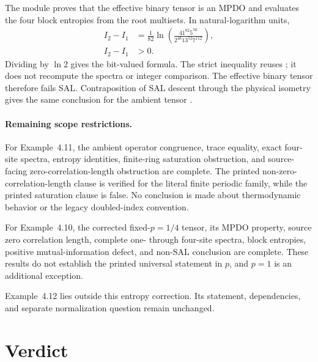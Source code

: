 \documentclass{article}
\begin{document}
The module  proves that the
effective binary tensor is an MPDO and evaluates the four block entropies from
the root multisets. In natural-logarithm units,
\begin{align}
    I_2-I_1
        &= \frac{1}{82}
            \ln\!\left(\frac{41^{82}5^{50}}
            {2^{48}13^{52}7^{112}}\right),
    \label{eq:cpsv16_examples_4_10_4_11_entropy_example411_formal_defect}\\
    I_2-I_1
        &> 0.
    \label{eq:cpsv16_examples_4_10_4_11_entropy_example411_formal_defect_positive}
\end{align}
Dividing by $\ln 2$ gives the bit-valued formula. The strict inequality reuses
; it does not
recompute the spectra or integer comparison. The effective binary tensor
therefore fails SAL. Contraposition of SAL descent through the physical
isometry gives the same conclusion for the ambient tensor
.

\paragraph{Remaining scope restrictions.}

For Example~4.11, the ambient operator congruence, trace equality, exact
four-site spectra, entropy identities, finite-ring saturation obstruction, and
source-facing zero-correlation-length obstruction are complete. The printed
non-zero-correlation-length clause is verified for the literal finite periodic
family, while the printed saturation clause is false. No conclusion is made
about thermodynamic behavior or the legacy doubled-index convention.

For Example~4.10, the corrected fixed-$p=1/4$ tensor, its MPDO property,
source zero correlation length, complete one- through four-site spectra, block
entropies, positive mutual-information defect, and non-SAL conclusion are
complete. These results do not establish the printed universal statement in
$p$, and $p=1$ is an additional exception.

Example~4.12 lies outside this entropy correction. Its statement,
dependencies, and separate normalization question remain unchanged.

\section{Verdict}
\end{document}
